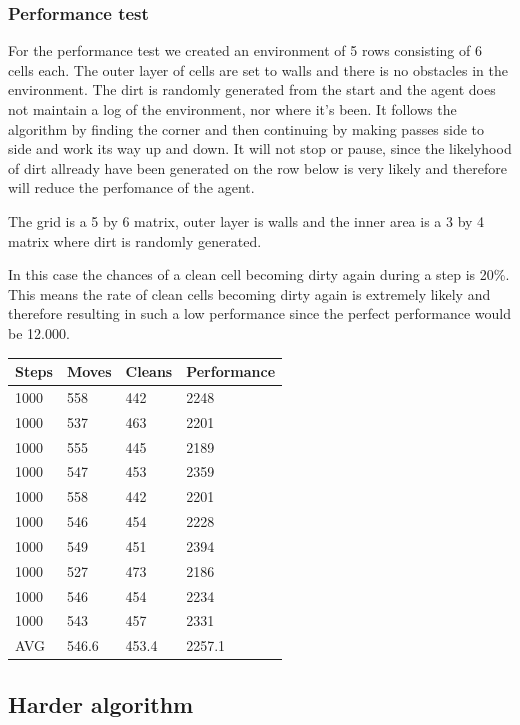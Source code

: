 \subsubsection{Performance test}
For the performance test we created an environment of 5 rows consisting of 6
cells each.  The outer layer of cells are set to walls and there is no obstacles
in the environment.  The dirt is randomly generated from the start and the agent
does not maintain a log of the environment, nor where it's been. It follows the
algorithm by finding the corner and then continuing by making passes side to
side and work its way up and down.  It will not stop or pause, since the
likelyhood of dirt allready have been generated on the row below is very likely
and therefore will reduce the perfomance of the agent.

The grid is a 5 by 6 matrix, outer layer is walls and the inner area is a 3 by 4
matrix where dirt is randomly generated.

In this case the chances of a clean cell becoming dirty again during a step is
20\%.  This means the rate of clean cells becoming dirty again is extremely
likely and therefore resulting in such a low performance since the perfect
performance would be 12.000.

\begin{longtable}{p{} p{} p{} 
									p{}}
Steps & Moves & Cleans	& Performance \\\hline
1000  & 	558 & 	442		& 2248	\\
1000  & 	537 & 	463 	& 2201	\\
1000  & 	555 & 	445 	& 2189	\\
1000  &		547 & 	453 	& 2359	\\
1000  & 	558 & 	442 	&	2201	\\
1000 	& 	546 & 	454 	&	2228	\\
1000 	& 	549 & 	451 	&	2394	\\
1000  &		527	& 	473		& 2186	\\
1000  &		546 & 	454		& 2234	\\
1000 	& 	543 & 	457		&	2331	\\\hline
AVG		& 546.6 &  	453.4 &	2257.1	\\\hline
\end{longtable}


\subsection{Harder algorithm}



